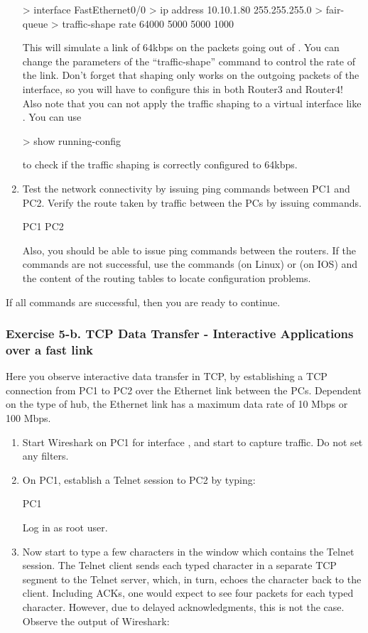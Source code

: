 \begin{enumerate}
		\begin{cmdblock}
	> interface FastEthernet0/0
	> ip address 10.10.1.80 255.255.255.0
	> fair-queue
	> traffic-shape rate 64000 5000 5000 1000
		\end{cmdblock}
		This will simulate a link of 64kbps on the packets going out of . You can change the parameters of the ``traffic-shape'' command to control the rate of the link. Don’t forget that shaping only works on the outgoing packets of the interface, so you will have to configure this in both Router3 and Router4! Also note that you can not apply the traffic shaping to a virtual interface like . You can use
		\begin{cmdblock}
	> show running-config
		\end{cmdblock}
		to check if the traffic shaping is correctly configured to 64kbps.
	\item Test the network connectivity by issuing ping commands between PC1 and PC2. Verify the route taken by traffic between the PCs by issuing  commands.
		\begin{cmdblock}
	PC1%
	PC2%
		\end{cmdblock}
		Also, you should be able to issue ping commands between the routers. If the commands are not successful, use the commands  (on Linux) or  (on IOS) and the content of the routing tables to locate configuration problems.
\end{enumerate}
If all commands are successful, then you are ready to continue.

\subsubsection{Exercise 5-b. TCP Data Transfer - Interactive Applications over a fast link}

Here you observe interactive data transfer in TCP, by establishing a TCP connection from PC1 to PC2 over the Ethernet link between the PCs. Dependent on the type of hub, the Ethernet link has a maximum data rate of 10 Mbps or 100 Mbps.
\begin{enumerate}
	\item Start Wireshark on PC1 for interface , and start to capture traffic. Do not set any filters.
	\item On PC1, establish a Telnet session to PC2 by typing: 
		\begin{cmdblock}
	PC1%
		\end{cmdblock}
		Log in as root user.
	\item Now start to type a few characters in the window which contains the Telnet session. The Telnet client sends each typed character in a separate TCP segment to the Telnet server, which, in turn, echoes the character back to the client. Including ACKs, one would expect to see four packets for each typed character. However, due to delayed acknowledgments, this is not the case.
		Observe the output of Wireshark:
\end{enumerate}

